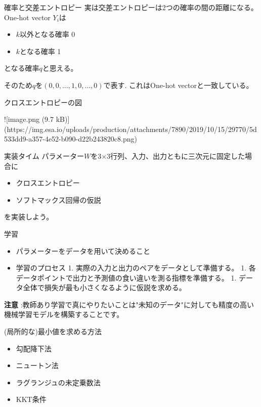 \begin{frame}{確率と交差エントロピー}
実は交差エントロピーは2つの確率の間の距離になる。
One-hot vector $Y_i$は
\begin{itemize}
  \item $k$以外となる確率 0
  \item $k$となる確率 1
\end{itemize}
となる確率$q$と思える。

そのため$q$を$(0, 0 , \ldots ,1,0, \ldots ,0)$で表す.
これはOne-hot vectorと一致している。
\end{frame}

\begin{frame}{クロスエントロピーの図}

![image.png (9.7 kB)](https://img.esa.io/uploads/production/attachments/7890/2019/10/15/29770/5d533dd9-a357-4e52-b090-d22b243820c8.png)

\end{frame}

\begin{frame}{実装タイム}
パラメーター$W$を3×3行列、入力、出力ともに三次元に固定した場合に
\begin{itemize}
\item クロスエントロピー
\item ソフトマックス回帰の仮説
\end{itemize}
を実装しよう。
\end{frame}

\begin{frame}{学習}
\begin{itemize}
\item パラメーターをデータを用いて決めること
\item 学習のプロセス
  1. 実際の入力と出力のペアをデータとして準備する。
  1. 各データポイントで出力と予測値の食い違いを測る指標を準備する。
  1. データ全体で損失が最も小さくなるように仮説を求める。
\end{itemize}
\textbf{注意} :教師あり学習で真にやりたいことは"未知のデータ"に対しても精度の高い機械学習モデルを構築することです。

\end{frame}

\begin{frame}{(局所的な)最小値を求める方法}
\begin{itemize}
\item 勾配降下法
\item ニュートン法
\item ラグランジュの未定乗数法
\item KKT条件
\end{itemize}
\end{frame}


